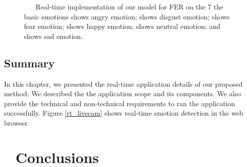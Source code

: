 \documentclass[master]{thesis-uestc}
\begin{document}
\begin{figure}
%
\hspace{8pt}%

\caption{\,\,\,\,\,\,\,\,\,\,Real-time implementation of our model for FER on the 7 the basic emotions
 shows angry emotion;
 shows disgust emotion;
 shows fear emotion;
 shows happy emotion;
 shows neutral emotion; and
 shows sad emotion.}
\label{fig:implementation}%
\end{figure}

\section{Summary}
In this chapter, we presented the real-time application details of our proposed method. We described the the application scope and its components. We also provide the technical and non-technical requirements to ran the application successfully. Figure \ref{rt_livecam} shows real-time emotion detection in the web browser.

\chapter{\,\,\,\,\,\textbf{Conclusions}}
\end{document}
